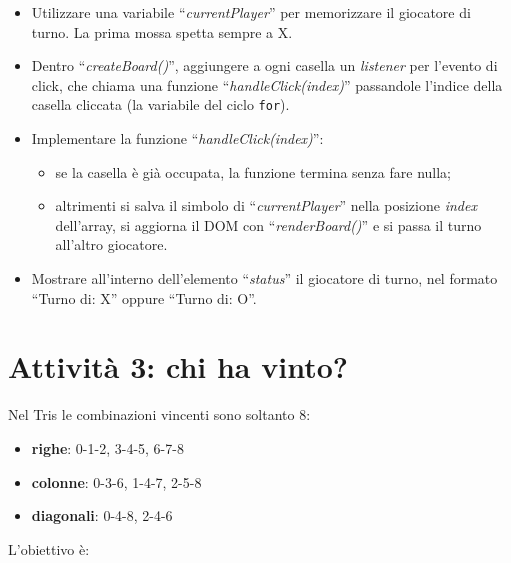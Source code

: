 \documentclass[a4paper,11pt]{article}
\newcommand{\elem}[1]{``\textit{#1}''}
\begin{document}
\begin{itemize}
    \item Utilizzare una variabile \elem{currentPlayer} per memorizzare il
    giocatore di turno. La prima mossa spetta sempre a X.
    \item Dentro \elem{createBoard()}, aggiungere a ogni casella un
    \textit{listener} per l'evento di click, che chiama una funzione
    \elem{handleClick(index)} passandole l'indice della casella cliccata (la
    variabile del ciclo \texttt{for}).
    \item Implementare la funzione \elem{handleClick(index)}:
    \begin{itemize}
        \item[--] se la casella è già occupata, la funzione termina senza fare
        nulla;
        \item[--] altrimenti si salva il simbolo di \elem{currentPlayer}
        nella posizione \textit{index} dell'array, si aggiorna il DOM con
        \elem{renderBoard()} e si passa il turno all'altro giocatore.
    \end{itemize}
    \item Mostrare all'interno dell'elemento \elem{status} il giocatore di
    turno, nel formato ``Turno di: X'' oppure ``Turno di: O''.
\end{itemize}

\section*{Attività 3: chi ha vinto?}

Nel Tris le combinazioni vincenti sono soltanto 8:

\begin{itemize}
    \item \textbf{righe}: 0-1-2, 3-4-5, 6-7-8
    \item \textbf{colonne}: 0-3-6, 1-4-7, 2-5-8
    \item \textbf{diagonali}: 0-4-8, 2-4-6
\end{itemize}

L'obiettivo è:
\end{document}
